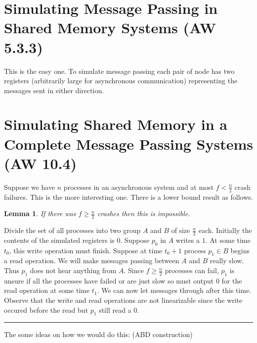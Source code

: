 \documentclass[twoside]{article}
\newtheorem{lemma}[theorem]{Lemma}
\newenvironment{proof}{{\bf Proof:}}{\hfill\rule{2mm}{2mm}}
\begin{document}
\section{Simulating Message Passing in Shared Memory Systems (AW 5.3.3)}
This is the easy one. To simulate message passing each pair of node has two registers (arbitrarily large for asynchronous communication) representing the messages sent in either direction. 

\section{Simulating Shared Memory in a Complete Message Passing Systems (AW 10.4)}
Suppose we have $n$ processes in an asynchronous system and at most $f < \frac{n}{2}$ crash failures. This is the more interesting one. There is a lower bound result as follows.

\begin{lemma}
If there was $f \geq \frac{n}{2}$ crashes then this is impossible.
\end{lemma}
\begin{proof}
Divide the set of all processes into two group $A$ and $B$ of size $\frac{n}{2}$ each. Initially the contents of the simulated registers is $0$. Suppose $p_0$ in $A$ writes a $1$. At some time $t_0$, this write operation must finish. Suppose at time $t_0 + 1$ process $p_1 \in B$ begins a read operation. We will make messages passing between $A$ and $B$ really slow. Thus $p_1$ does not hear anything from $A$. Since $f \geq \frac{n}{2}$ processes can fail, $p_1$ is unsure if all the processes have failed or are just slow so must output $0$ for the read operation at some time $t_1$. We can now let messages through after this time. Observe that the write and read operations are not linearizable since the write occured before the read but $p_1$ still read a $0$.   
\end{proof}

The some ideas on how we would do this: (ABD construction)
\end{document}
